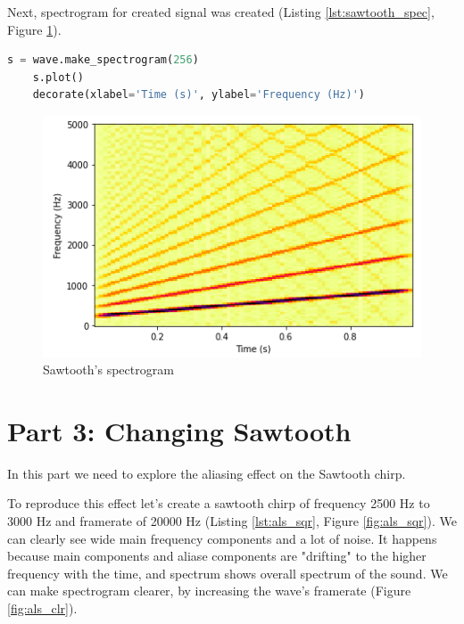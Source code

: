 \documentclass[a4paper]{article}
\begin{document}
        Next, spectrogram for created signal was created (Listing \ref{lst:sawtooth_spec}, Figure \ref{fig:sawtooth_spec}).
            
        \begin{lstlisting}[language=Python,caption=Sawtooth's spectrum computation,label={lst:sawtooth_spec}]
    s = wave.make_spectrogram(256)
    s.plot()
    decorate(xlabel='Time (s)', ylabel='Frequency (Hz)')
        \end{lstlisting}
        
        \begin{figure}[H]
          \centering
          \includegraphics[width=\textwidth]{img/sew_s.png}
          \caption{Sawtooth's spectrogram}
          \label{fig:sawtooth_spec}
        \end{figure}
        
    \newpage
        \section{Part 3: Changing Sawtooth}
            
        In this part we need to explore the aliasing effect on the Sawtooth chirp. 
        
        To reproduce this effect let's create a sawtooth chirp of frequency 2500 Hz to 3000 Hz and framerate of 20000 Hz (Listing \ref{lst:als_sqr}, Figure \ref{fig:als_sqr}). We can clearly see wide main frequency components and a lot of noise. It happens because main components and aliase components are "drifting" to the higher frequency with the time, and spectrum shows overall spectrum of the sound. We can make spectrogram clearer, by increasing the wave's framerate (Figure \ref{fig:als_clr}).
        
\end{document}
